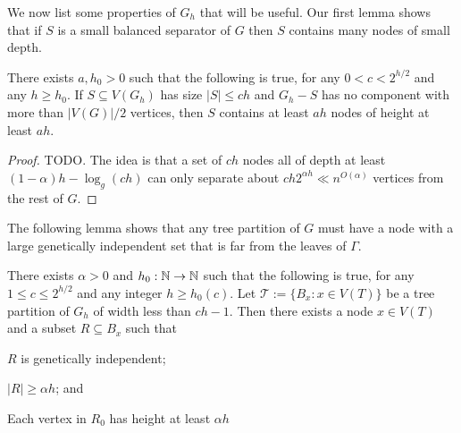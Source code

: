 \documentclass{patmorin}
\begin{document}

We now list some properties of $G_h$ that will be useful.  
Our first lemma shows that if $S$ is a small balanced separator of $G$ then $S$ contains many nodes of small depth.

\begin{lem}\label{small_depth_separator}
  There exists $a,h_0 >0$ such that the following is true, for any $0 < c < 2^{h/2}$ and any $h\ge h_0$.
  If $S\subseteq V(G_h)$ has size $|S|\le ch$ and $G_h-S$ has no component with more than $|V(G)|/2$ vertices, then $S$ contains at least $ah$ nodes of height at least $ah$. 
\end{lem}

\begin{proof}
  TODO. The idea is that a set of $ch$ nodes all of depth at least $(1-\alpha)h-\log_g(ch)$ can only separate about $ch2^{\alpha h}\ll n^{O(\alpha)}$ vertices from the rest of $G$.
\end{proof}


The following lemma shows that any tree partition of $G$ must have a node with a large genetically independent set that is far from the leaves of $\Gamma$.

\begin{lem}\label{startup}
  There exists $\alpha >0$ and $h_0:\mathbb{N}\to\mathbb{N}$ such that the following is true, for any $1\le c\le 2^{h/2}$ and any integer $h\ge h_0(c)$.  Let $\mathcal{T}:=\{B_x:x\in V(T)\}$ be a tree partition of $G_h$ of width less than $ch-1$.  Then there exists a node $x\in V(T)$ and a subset $R\subseteq B_x$ such that
  \begin{compactenum}[(i)]
    \item $R$ is genetically independent;
    \item $|R|\ge \alpha h$; and
    \item Each vertex in $R_0$ has height at least $\alpha h$ 
  \end{compactenum}
\end{lem}
\end{document}
